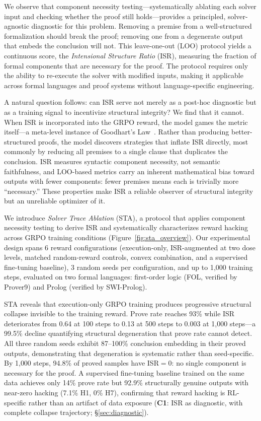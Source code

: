 We observe that component necessity testing---systematically ablating each solver input and checking whether the proof still holds---provides a principled, solver-agnostic diagnostic for this problem.
Removing a premise from a well-structured formalization should break the proof; removing one from a degenerate output that embeds the conclusion will not.
This leave-one-out (LOO) protocol yields a continuous score, the \emph{Intensional Structure Ratio} (ISR), measuring the fraction of formal components that are necessary for the proof.
The protocol requires only the ability to re-execute the solver with modified inputs, making it applicable across formal languages and proof systems without language-specific engineering.

A natural question follows: can ISR serve not merely as a post-hoc diagnostic but as a training signal to incentivize structural integrity?
We find that it cannot.
When ISR is incorporated into the GRPO reward, the model games the metric itself---a meta-level instance of Goodhart's Law~\citep{manheim-goodhart-taxonomy, gao-reward-overoptimization}.
Rather than producing better-structured proofs, the model discovers strategies that inflate ISR directly, most commonly by reducing all premises to a single clause that duplicates the conclusion.
ISR measures syntactic component necessity, not semantic faithfulness, and LOO-based metrics carry an inherent mathematical bias toward outputs with fewer components: fewer premises means each is trivially more ``necessary.''
These properties make ISR a reliable observer of structural integrity but an unreliable optimizer of it.

We introduce \emph{Solver Trace Ablation} (STA), a protocol that applies component necessity testing to derive ISR and systematically characterizes reward hacking across GRPO training conditions (Figure~\ref{fig:sta_overview}).
Our experimental design spans 6 reward configurations (execution-only, ISR-augmented at two dose levels, matched random-reward controls, convex combination, and a supervised fine-tuning baseline), 3 random seeds per configuration, and up to 1{,}000 training steps, evaluated on two formal languages: first-order logic (FOL, verified by Prover9) and Prolog (verified by SWI-Prolog).

STA reveals that execution-only GRPO training produces progressive structural collapse invisible to the training reward.
Prove rate reaches 93\% while ISR deteriorates from 0.64 at 100 steps to 0.13 at 500 steps to 0.003 at 1{,}000 steps---a 99.5\% decline quantifying structural degeneration that prove rate cannot detect.
All three random seeds exhibit 87--100\% conclusion embedding in their proved outputs, demonstrating that degeneration is systematic rather than seed-specific.
By 1{,}000 steps, 94.8\% of proved samples have ISR${=}$0: no single component is necessary for the proof.
A supervised fine-tuning baseline trained on the same data achieves only 14\% prove rate but 92.9\% structurally genuine outputs with near-zero hacking (7.1\% H1, 0\% H7), confirming that reward hacking is RL-specific rather than an artifact of data exposure (\textbf{C1}: ISR as diagnostic, with complete collapse trajectory; \S\ref{sec:diagnostic}).

